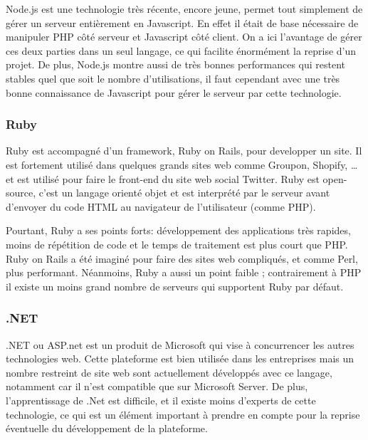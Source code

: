         Node.js est une technologie très récente, encore jeune, permet tout simplement de gérer un
        serveur entièrement en Javascript. En effet il était de base nécessaire de manipuler PHP côté serveur
        et Javascript côté client. On a ici l’avantage de gérer ces deux parties dans un seul langage, ce qui
        facilite énormément la reprise d’un projet. De plus, Node.js montre aussi de très bonnes
        performances qui restent stables quel que soit le nombre d’utilisations, il faut cependant avec une
        très bonne connaissance de Javascript pour gérer le serveur par cette technologie.

        \subsubsection{Ruby}
        \label{subsubsec:ruby}
        Ruby est accompagné d’un framework, Ruby on Rails, pour developper un site. Il est
        fortement utilisé dans quelques grands sites web comme Groupon, Shopify, … et est utilisé pour faire
        le front-end du site web social Twitter. Ruby est open-source, c’est un langage orienté objet et est
        interprété par le serveur avant d’envoyer du code HTML au navigateur de l’utilisateur (comme PHP).

        Pourtant, Ruby a ses points forts: développement des applications très rapides, moins de répétition
        de code et le temps de traitement est plus court que PHP. Ruby on Rails a été imaginé pour faire des
        sites web compliqués, et comme Perl, plus performant. Néanmoins, Ruby a aussi un point faible ;
        contrairement à PHP il existe un moins grand nombre de serveurs qui supportent Ruby par défaut.

        \subsubsection{.NET}
        \label{subsubsec:dotnet}
        .NET ou ASP.net est un produit de Microsoft qui vise à concurrencer les autres technologies web.
        Cette plateforme est bien utilisée dans les entreprises mais un nombre restreint de site web
        sont actuellement développés avec ce langage, notamment car il n’est compatible que sur Microsoft Server.
        De plus, l’apprentissage de .Net est difficile, et il existe moins d’experts de cette technologie,
        ce qui est un élément important à prendre en compte pour la reprise éventuelle du développement de la plateforme.



